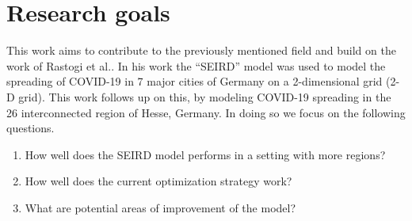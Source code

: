 \section{Research goals}
This work aims to contribute to the previously mentioned field
and build on the work of Rastogi et al.\cite{Rastogi}. In his work the ``SEIRD'' model\cite{Wittum1,Wittum2} was used to
model the spreading of COVID-19 in 7 major cities of Germany on a 2-dimensional grid (2-D grid). This work follows up on this, by
modeling COVID-19 spreading in the 26 interconnected region of Hesse, Germany. In doing so we focus on the following questions.

\begin{enumerate}
	\item How well does the SEIRD model performs in a setting with more regions?
	\item How well does the current optimization strategy work?
	\item What are potential areas of improvement of the model?
\end{enumerate}

